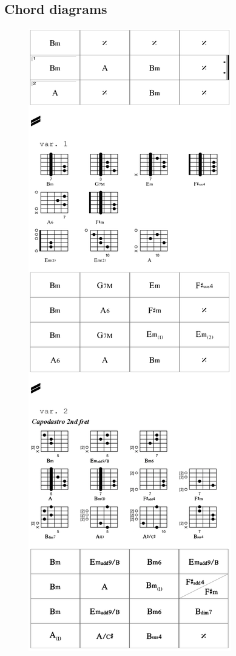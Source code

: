 \newpage
\subsection*{\quad Chord diagrams}
\label{kjcccc}

 \begin{figure}[H]
\begin{center}
\includegraphics[scale=0.66]{img/k540}
\end{center}
\end{figure}

